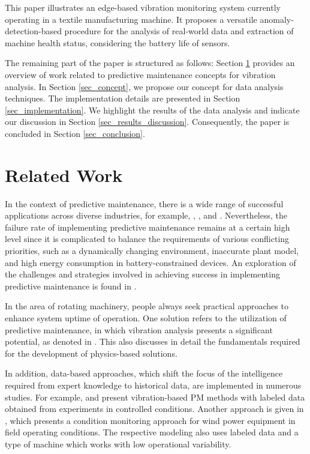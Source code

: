 \documentclass[conference]{IEEEtran}
\begin{document}
This paper illustrates an edge-based vibration monitoring system currently operating in a textile manufacturing machine. It proposes a versatile anomaly-detection-based procedure for the analysis of real-world data and extraction of machine health status, considering the battery life of sensors.

The remaining part of the paper is structured as follows: Section \ref{sec_related_work} provides an overview of work related to predictive maintenance concepts for vibration analysis. In Section \ref{sec_concept}, we propose our concept for data analysis techniques. The implementation details are presented in Section \ref{sec_implementation}. We highlight the results of the data analysis and indicate our discussion in Section \ref{sec_results_discussion}. Consequently, the paper is concluded in Section \ref{sec_conclusion}.



\section{Related Work}
\label{sec_related_work}

In the context of predictive maintenance, there is a wide range of successful applications across diverse industries, for example, \cite{adebiyi}, \cite{alnajjar}, and \cite{doyleek}. Nevertheless, the failure rate of implementing predictive maintenance remains at a certain high level since it is complicated to balance the requirements of various conflicting priorities, such as a dynamically changing environment, inaccurate plant model, and high energy consumption in battery-constrained devices. An exploration of the challenges and strategies involved in achieving success in implementing predictive maintenance is found in \cite{carnero2006evaluation}.

In the area of rotating machinery, people always seek practical approaches to enhance system uptime of operation. One solution refers to the utilization of predictive maintenance, in which vibration analysis presents a significant potential, as denoted in \cite{b1}. This also discusses in detail the fundamentals required for the development of physics-based solutions.

In addition, data-based approaches, which shift the focus of the intelligence required from expert knowledge to historical data, are implemented in numerous studies. For example, \cite{wu2017remaining} and \cite{li2020lifelong} present vibration-based PM methods with labeled data obtained from experiments in controlled conditions. Another approach is given in \cite{cui2018anomaly}, which presents a condition monitoring approach for wind power equipment in field operating conditions. The respective modeling also uses labeled data and a type of machine which works with low operational variability.
\end{document}
